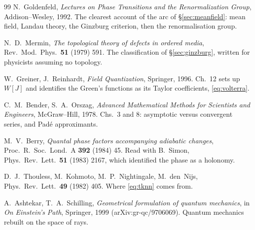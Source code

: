 \documentclass[10pt,a4paper]{article}
\theoremstyle{plain}
\theoremstyle{definition}
\numberwithin{equation}{section}
\begin{document}
\begin{thebibliography}{99}
 N.~Goldenfeld, \emph{Lectures on Phase Transitions and the Renormalization
Group}, Addison--Wesley, 1992. The clearest account of the arc of \S\ref{sec:meanfield}: mean
field, Landau theory, the Ginzburg criterion, then the renormalisation group.

 N.~D.~Mermin, \emph{The topological theory of defects in ordered media},
Rev.\ Mod.\ Phys.\ \textbf{51} (1979) 591. The classification of \S\ref{sec:ginzburg}, written
for physicists assuming no topology.

 W.~Greiner, J.~Reinhardt, \emph{Field Quantization}, Springer, 1996. Ch.\ 12
sets up $W[J]$ and identifies the Green's functions as its Taylor coefficients,
\eqref{eq:volterra}.

 C.~M.~Bender, S.~A.~Orszag, \emph{Advanced Mathematical Methods for
Scientists and Engineers}, McGraw--Hill, 1978. Chs.\ 3 and 8: asymptotic versus convergent
series, and Pad\'e approximants.

 M.~V.~Berry, \emph{Quantal phase factors accompanying adiabatic changes},
Proc.\ R.\ Soc.\ Lond.\ A \textbf{392} (1984) 45. Read with B.~Simon,
Phys.\ Rev.\ Lett.\ \textbf{51} (1983) 2167, which identified the phase as a holonomy.

 D.~J.~Thouless, M.~Kohmoto, M.~P.~Nightingale, M.~den~Nijs,
Phys.\ Rev.\ Lett.\ \textbf{49} (1982) 405. Where \eqref{eq:tknn} comes from.

 A.~Ashtekar, T.~A.~Schilling, \emph{Geometrical formulation of
quantum mechanics}, in \emph{On Einstein's Path}, Springer, 1999 (arXiv:gr-qc/9706069).
Quantum mechanics rebuilt on the space of rays.

\end{thebibliography}
\end{document}
